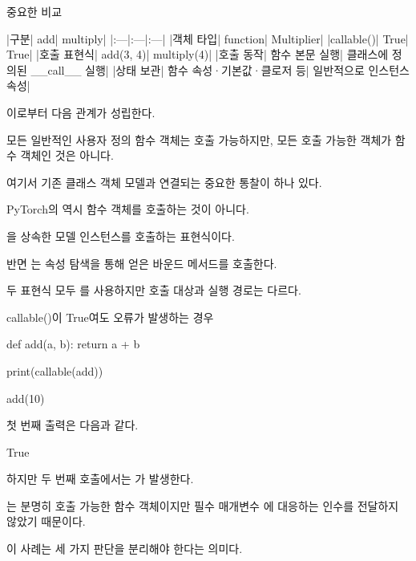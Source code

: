 \begin{dhknote}
\begin{dhksmry}[centered]
중요한 비교
\end{dhksmry}
\end{dhknote}

\begin{dhktable}
|구분|	add|	multiply|
|:---|:---|:---|
|객체 타입|	function|	Multiplier|
|callable()|	True|	True|
|호출 표현식|	add(3, 4)|	multiply(4)|
|호출 동작|	함수 본문 실행|	클래스에 정의된 __call__ 실행|
|상태 보관|	함수 속성·기본값·클로저 등|	일반적으로 인스턴스 속성|
\end{dhktable}

이로부터 다음 관계가 성립한다.

모든 일반적인 사용자 정의 함수 객체는 호출 가능하지만, 모든 호출 가능한 객체가 함수 객체인 것은 아니다.

여기서 기존 클래스 객체 모델과 연결되는 중요한 통찰이 하나 있다.

PyTorch의  역시 함수 객체를 호출하는 것이 아니다.

을 상속한 모델 인스턴스를 호출하는 표현식이다.

반면 는 속성 탐색을 통해 얻은 바운드 메서드를 호출한다.

두 표현식 모두 \zsh{()}를 사용하지만 호출 대상과 실행 경로는 다르다.

\begin{dhknote}
\begin{dhksmry}[centered]
callable()이 True여도 오류가 발생하는 경우
\end{dhksmry}
\end{dhknote}

\begin{dhkcode}
def add(a, b):
    return a + b

print(callable(add))

add(10)
\end{dhkcode}

첫 번째 출력은 다음과 같다.

\begin{dhkzsh}
True
\end{dhkzsh}

하지만 두 번째 호출에서는 가 발생한다.

는 분명히 호출 가능한 함수 객체이지만 필수 매개변수 에 대응하는 인수를 전달하지 않았기 때문이다.

이 사례는 세 가지 판단을 분리해야 한다는 의미다.

